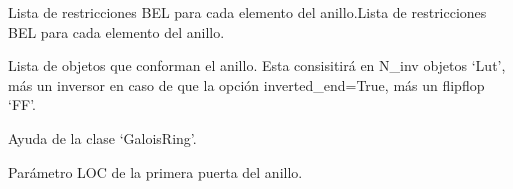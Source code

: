 \documentclass[letterpaper,10pt,english]{sphinxmanual}
\begin{document}
\begin{fulllineitems}

\begin{fulllineitems}
\label{\detokenize{fpga.ring_osc:fpga.ring_osc.GaloisRing.bel}}
\pysigstartsignatures
{}
\pysigstopsignatures
\sphinxAtStartPar
Lista de restricciones BEL para cada elemento del anillo.Lista de restricciones BEL para cada elemento del anillo.

\end{fulllineitems}


\begin{fulllineitems}
\label{\detokenize{fpga.ring_osc:fpga.ring_osc.GaloisRing.elements}}
\pysigstartsignatures
{}
\pysigstopsignatures
\sphinxAtStartPar
Lista de objetos que conforman el anillo. Esta consisitirá en N\_inv objetos ‘Lut’, más un inversor en caso de que la opción {\color{red}\bfseries{}\textasciigrave{}}inverted\_end\textasciigrave{}=True, más un flip\sphinxhyphen{}flop ‘FF’.

\end{fulllineitems}


\begin{fulllineitems}
\label{\detokenize{fpga.ring_osc:fpga.ring_osc.GaloisRing.help}}
\pysigstartsignatures
{}
\pysigstopsignatures
\sphinxAtStartPar
Ayuda de la clase ‘GaloisRing’.

\end{fulllineitems}


\begin{fulllineitems}
\label{\detokenize{fpga.ring_osc:fpga.ring_osc.GaloisRing.loc}}
\pysigstartsignatures
{}
\pysigstopsignatures
\sphinxAtStartPar
Parámetro LOC de la primera puerta del anillo.

\end{fulllineitems}


\end{fulllineitems}
\end{document}
